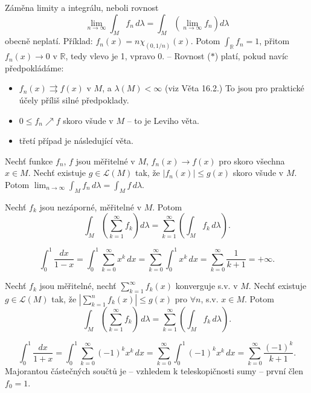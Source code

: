\begin{poznamka}
Záměna limity a integrálu, neboli rovnost
\[
\lim_{n \to \infty} \int_M f_n \, d\lambda
= \int_M \left( \lim_{n \to \infty} f_n \right) d\lambda \tag{$\ast$}
\]
obecně neplatí. Příklad: $f_n(x) = n\chi_{(0,1/n)}(x)$. Potom
$\int_{\mathbb{R}} f_n = 1$, přitom $f_n(x) \to 0$ v $\mathbb{R}$, tedy
vlevo je 1, vpravo 0. -- Rovnost ($\ast$) platí, pokud navíc
předpokládáme:
\begin{itemize}
\item $f_n(x) \rightrightarrows f(x)$ v $M$, a $\lambda(M) < \infty$
(viz Věta 16.2.) To jsou pro praktické účely příliš silné předpoklady.
\item $0 \le f_n \nearrow f$ skoro všude v $M$ -- to je Leviho věta.
\item třetí případ je následující věta.
\end{itemize}
\end{poznamka}

\begin{veta}
Nechť funkce $f_n$, $f$ jsou měřitelné v $M$, $f_n(x) \to f(x)$ pro
skoro všechna $x \in M$. Nechť existuje $g \in \mathcal{L}(M)$ tak, že
$|f_n(x)| \le g(x)$ skoro všude v $M$. Potom
$\lim_{n \to \infty} \int_M f_n \, d\lambda = \int_M f \, d\lambda$.
\end{veta}

\begin{veta}
Nechť $f_k$ jsou nezáporné, měřitelné v $M$. Potom
\[
\int_M \left( \sum_{k=1}^{\infty} f_k \right) d\lambda
= \sum_{k=1}^{\infty} \left( \int_M f_k \, d\lambda \right).
\]
\end{veta}

\begin{priklad}
\[
\int_0^1 \frac{dx}{1 - x}
= \int_0^1 \sum_{k=0}^{\infty} x^k \, dx
= \sum_{k=0}^{\infty} \int_0^1 x^k \, dx
= \sum_{k=0}^{\infty} \frac{1}{k+1}
= +\infty.
\]
\end{priklad}

\begin{veta}
Nechť $f_k$ jsou měřitelné, nechť $\sum_{k=1}^{\infty} f_k(x)$
konverguje s.v. v $M$. Nechť existuje $g \in \mathcal{L}(M)$ tak, že
$\left| \sum_{k=1}^{n} f_k(x) \right| \le g(x)$ pro $\forall n$,
s.v. $x \in M$. Potom
\[
\int_M \left( \sum_{k=1}^{\infty} f_k \right) \, d\lambda
= \sum_{k=1}^{\infty} \left( \int_M f_k \, d\lambda \right).
\]
\end{veta}

\begin{priklad}
\[
\int_0^1 \frac{dx}{1 + x}
= \int_0^1 \sum_{k=0}^{\infty} (-1)^k x^k \, dx
= \sum_{k=0}^{\infty} \int_0^1 (-1)^k x^k \, dx
= \sum_{k=0}^{\infty} \frac{(-1)^k}{k+1}.
\]
Majorantou částečných součtů je -- vzhledem k teleskopičnosti sumy --
první člen $f_0 = 1$.
\end{priklad}

